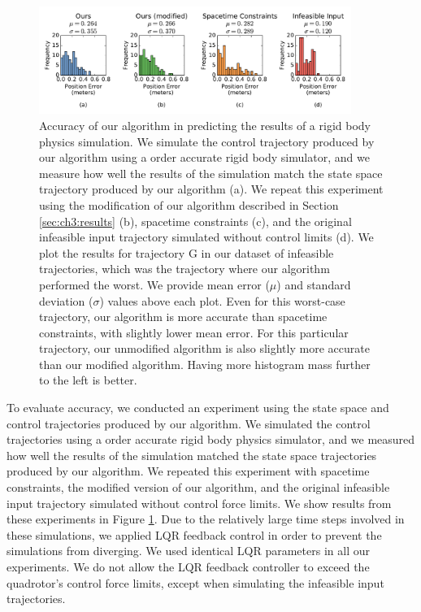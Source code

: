\begin{figure}[t!]
\centering
\includegraphics[width=4.0in]{images/2016_siggraph/02_accuracy.pdf}
\caption{
Accuracy of our algorithm in predicting the results of a rigid body physics simulation.
We simulate the control trajectory produced by our algorithm using a  order accurate rigid body simulator, and we measure how well the results of the simulation match the state space trajectory produced by our algorithm (a).
We repeat this experiment using the modification of our algorithm described in Section \ref{sec:ch3:results} (b), spacetime constraints (c), and the original infeasible input trajectory simulated without control limits (d).
We plot the results for trajectory \textsc{G} in our dataset of infeasible trajectories, which was the trajectory where our algorithm performed the worst.
We provide mean error ($\mu$) and standard deviation ($\sigma$) values above each plot.
Even for this worst-case trajectory, our algorithm is more accurate than spacetime constraints, with slightly lower mean error.
For this particular trajectory, our unmodified algorithm is also slightly more accurate than our modified algorithm.
Having more histogram mass further to the left is better.
}
\label{fig:ch3:accuracy}
\end{figure}

To evaluate accuracy, we conducted an experiment using the state space and control trajectories produced by our algorithm.
We simulated the control trajectories using a  order accurate rigid body physics simulator, and we measured how well the results of the simulation matched the state space trajectories produced by our algorithm.
We repeated this experiment with spacetime constraints, the modified version of our algorithm, and the original infeasible input trajectory simulated without control force limits.
We show results from these experiments in Figure \ref{fig:ch3:accuracy}.
Due to the relatively large time steps involved in these simulations, we applied LQR feedback control \cite{tedrake:2016} in order to prevent the simulations from diverging.
We used identical LQR parameters in all our experiments.
We do not allow the LQR feedback controller to exceed the quadrotor's control force limits, except when simulating the infeasible input trajectories.

